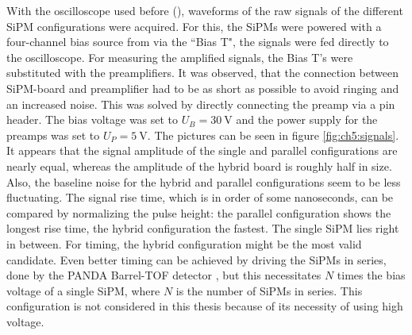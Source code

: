 With the oscilloscope used before (), waveforms of the raw signals of the different SiPM configurations were acquired. For this, the SiPMs were powered with a four-channel bias source from  via the ``Bias T", the signals were fed directly to the oscilloscope. For measuring the amplified signals, the Bias T's were substituted with the  preamplifiers. It was observed, that the connection between SiPM-board and preamplifier had to be as short as possible to avoid ringing and an increased noise. This was solved by directly connecting the preamp via a pin header. The bias voltage was set to $U_B=\SI{30}{\volt}$ and the power supply for the preamps was set to $U_P=\SI{5}{\volt}$. The pictures can be seen in figure \ref{fig:ch5:signals}. 
It appears that the signal amplitude of the single and parallel configurations are nearly equal, whereas the amplitude of the hybrid board is roughly half in size. Also, the baseline noise for the hybrid and parallel configurations seem to be less fluctuating. The signal rise time, which is in order of some nanoseconds, can be compared by normalizing the pulse height: the parallel configuration shows the longest rise time, the hybrid configuration the fastest. The single SiPM lies right in between. For timing, the hybrid configuration might be the most valid candidate. Even better timing can be achieved by driving the SiPMs in series, done by the PANDA Barrel-TOF detector \cite{SciTil}, but this necessitates $N$ times the bias voltage of a single SiPM, where $N$ is the number of SiPMs in series. This configuration is not considered in this thesis because of its necessity of using high voltage.   


